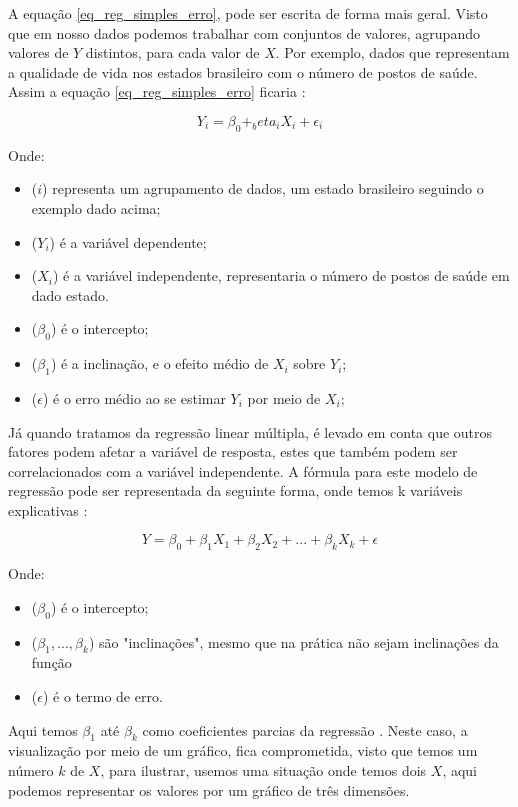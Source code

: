 \documentclass[
	12pt,				%
	openright,			%
	oneside,			%
	a4paper,			%
	english,			%
	brazil				%
	]{abntex2}
\begin{document}
A equação \ref{eq_reg_simples_erro}, pode ser escrita de forma mais geral. Visto que em nosso dados
podemos trabalhar com conjuntos de valores, agrupando valores de $Y$ distintos, para cada valor de $X$.
Por exemplo, dados que representam a qualidade de vida nos estados brasileiro com o número de postos 
de saúde. Assim a equação \ref{eq_reg_simples_erro} ficaria \cite{modelos_regressao_linear}:

\begin{equation}
	\label{eq_reg_simples_geral}
	Y_i = \beta_0 + _beta_iX_i + \epsilon_i
\end{equation}

Onde:
\begin{itemize}
	\item ($i$) representa um agrupamento de dados, um estado brasileiro seguindo o exemplo dado acima;
	\item ($Y_i$) é a variável dependente;
	\item ($X_i$) é a variável independente, representaria o número de postos de saúde em dado estado.
	\item ($\beta_0$) é o intercepto;
	\item ($\beta_1$) é a inclinação, e o efeito médio de $X_i$ sobre $Y_i$;
	\item ($\epsilon$) é o erro médio ao se estimar $Y_i$ por meio de $X_i$;
\end{itemize}

Já quando tratamos da regressão linear múltipla, é levado em conta que outros fatores podem afetar a 
variável de resposta, estes que também podem ser correlacionados com a variável independente. A fórmula 
para este modelo de regressão pode ser representada da seguinte forma, onde temos k variáveis 
explicativas \cite{modelos_regressao_linear}:

\begin{equation}
	\label{rq_reg_multipla}
	Y = \beta_0 + \beta_1X_1 + \beta_2X_2 + ... + \beta_kX_k + \epsilon
\end{equation}

Onde:
\begin{itemize}
	\item ($\beta_0$) é o intercepto;
	\item ($\beta_1,...,\beta_k$) são "inclinações", mesmo que na prática não sejam inclinações da função
	\item ($\epsilon$) é o termo de erro.
\end{itemize}

Aqui temos $\beta_1$ até $\beta_k$ como coeficientes parcias da regressão \cite{modelos_regressao_linear}. 
Neste caso, a visualização por meio de um gráfico, fica comprometida, visto que temos um número $k$ de 
$X$, para ilustrar, usemos uma situação onde temos dois $X$, aqui podemos representar os valores por 
um gráfico de três dimensões.
\end{document}
